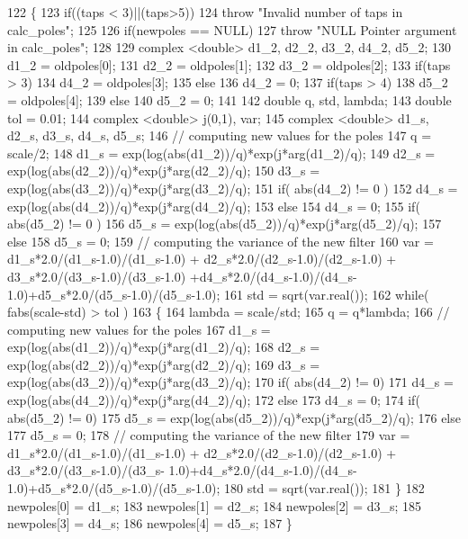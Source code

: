 \begin{DoxyCode}
122 \{
123     \textcolor{keywordflow}{if}((taps < 3)||(taps>5))
124         \textcolor{keywordflow}{throw} \textcolor{stringliteral}{"Invalid number of taps in calc\_poles"};
125     
126     \textcolor{keywordflow}{if}(newpoles == NULL)
127         \textcolor{keywordflow}{throw} \textcolor{stringliteral}{"NULL Pointer argument in calc\_poles"};
128 
129     complex <double> d1\_2, d2\_2, d3\_2, d4\_2, d5\_2;
130     d1\_2 = oldpoles[0];
131     d2\_2 = oldpoles[1];
132     d3\_2 = oldpoles[2];
133     \textcolor{keywordflow}{if}(taps > 3)
134         d4\_2 = oldpoles[3];
135     \textcolor{keywordflow}{else}
136         d4\_2 = 0;
137     \textcolor{keywordflow}{if}(taps > 4)
138         d5\_2 = oldpoles[4];
139     \textcolor{keywordflow}{else}
140         d5\_2 = 0;
141     
142     \textcolor{keywordtype}{double} q, std, lambda;
143     \textcolor{keywordtype}{double} tol = 0.01;
144     complex <double> j(0,1), var;
145     complex <double> d1\_s, d2\_s, d3\_s, d4\_s, d5\_s;
146     \textcolor{comment}{// computing new values for the poles}
147     q = scale/2;
148     d1\_s = exp(log(abs(d1\_2))/q)*exp(j*arg(d1\_2)/q);
149     d2\_s = exp(log(abs(d2\_2))/q)*exp(j*arg(d2\_2)/q);
150     d3\_s = exp(log(abs(d3\_2))/q)*exp(j*arg(d3\_2)/q);
151     \textcolor{keywordflow}{if}( abs(d4\_2) != 0 )
152         d4\_s = exp(log(abs(d4\_2))/q)*exp(j*arg(d4\_2)/q);
153     \textcolor{keywordflow}{else}
154         d4\_s = 0;
155     \textcolor{keywordflow}{if}( abs(d5\_2) != 0 )
156         d5\_s = exp(log(abs(d5\_2))/q)*exp(j*arg(d5\_2)/q);
157     \textcolor{keywordflow}{else}
158         d5\_s = 0;
159     \textcolor{comment}{// computing the variance of the new filter}
160     var =  d1\_s*2.0/(d1\_s-1.0)/(d1\_s-1.0) + d2\_s*2.0/(d2\_s-1.0)/(d2\_s-1.0) + d3\_s*2.0/(d3\_s-1.0)/(d3\_s-1.0)
      +d4\_s*2.0/(d4\_s-1.0)/(d4\_s-1.0)+d5\_s*2.0/(d5\_s-1.0)/(d5\_s-1.0);
161     std = sqrt(var.real());
162     \textcolor{keywordflow}{while}( fabs(scale-std) > tol )
163     \{
164         lambda = scale/std;
165         q = q*lambda;
166         \textcolor{comment}{// computing new values for the poles}
167         d1\_s = exp(log(abs(d1\_2))/q)*exp(j*arg(d1\_2)/q);
168         d2\_s = exp(log(abs(d2\_2))/q)*exp(j*arg(d2\_2)/q);
169         d3\_s = exp(log(abs(d3\_2))/q)*exp(j*arg(d3\_2)/q);
170         \textcolor{keywordflow}{if}( abs(d4\_2) != 0)
171             d4\_s = exp(log(abs(d4\_2))/q)*exp(j*arg(d4\_2)/q);
172         \textcolor{keywordflow}{else}
173             d4\_s = 0;
174         \textcolor{keywordflow}{if}( abs(d5\_2) != 0)
175             d5\_s = exp(log(abs(d5\_2))/q)*exp(j*arg(d5\_2)/q);
176         \textcolor{keywordflow}{else}
177             d5\_s = 0;
178         \textcolor{comment}{// computing the variance of the new filter}
179         var =  d1\_s*2.0/(d1\_s-1.0)/(d1\_s-1.0) + d2\_s*2.0/(d2\_s-1.0)/(d2\_s-1.0) + d3\_s*2.0/(d3\_s-1.0)/(d3\_s-
      1.0)+d4\_s*2.0/(d4\_s-1.0)/(d4\_s-1.0)+d5\_s*2.0/(d5\_s-1.0)/(d5\_s-1.0);
180         std = sqrt(var.real());
181     \}
182     newpoles[0] = d1\_s;
183     newpoles[1] = d2\_s;
184     newpoles[2] = d3\_s;
185     newpoles[3] = d4\_s;
186     newpoles[4] = d5\_s;
187 \}
\end{DoxyCode}
